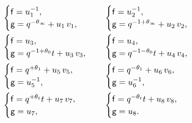 \documentclass[a4paper,reqno,11pt]{amsart}
\numberwithin{equation}{section}
\numberwithin{figure}{section}
\theoremstyle{plain}
\theoremstyle{remark}
\numberwithin{rhp}{section}
\begin{document}
\begin{align*}
    &\begin{cases}
        {\sf f}=u_1^{-1},&\\
        {\sf g}=q^{-\theta_\infty}+u_1\,v_1, &
    \end{cases} &
          &\begin{cases}
        {\sf f}=u_2^{-1}, &\\
         {\sf g}=q^{-1+\theta_\infty}+u_2\, v_2, &
    \end{cases}\\
   &\begin{cases}
        {\sf f}=u_3, &\\
         {\sf g}=q^{-1+\theta_0}t+u_3\,v_3, &
    \end{cases} &
    &\begin{cases}
        {\sf f}=u_4, &\\
         {\sf g}=q^{-1-\theta_0}t+u_4\,v_4, &
    \end{cases}\\
    &\begin{cases}
        {\sf f}=q^{+\theta_1}+u_5\,v_5, &\\
         {\sf g}=u_5^{-1}, &
    \end{cases} &
    &\begin{cases}
        {\sf f}=q^{-\theta_1}+u_6\,v_6, &\\
         {\sf g}=u_6^{-1}, &
    \end{cases}\\
  &\begin{cases}
        {\sf f}=q^{+\theta_t}t+u_7\,v_7, &\\
         {\sf g}=u_7, &
    \end{cases} &
    &\begin{cases}
        {\sf f}=q^{-\theta_t}t+u_8\,v_8, &\\
         {\sf g}=u_8. &
    \end{cases}
\end{align*}
\end{document}
